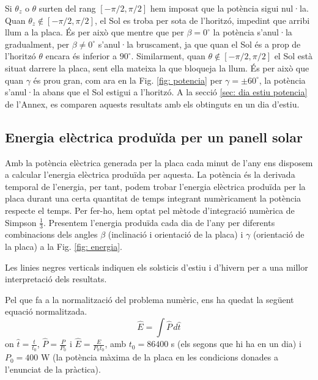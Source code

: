 \documentclass[11pt]{article}
\begin{document}
Si $\theta_z$ o $\theta$ surten del rang $[-\pi/2,\pi/2]$ hem imposat que la potència sigui nul·la. Quan $\theta_z \notin [-\pi/2,\pi/2]$, el Sol es troba per sota de l'horitzó, impedint que arribi llum a la placa. És per això que mentre que per $\beta = 0^{\circ}$ la potència s'anul·la gradualment, per $\beta \neq 0^{\circ}$ s'anul·la bruscament, ja que quan el Sol és a prop de l’horitzó $\theta$ encara és inferior a $90^{\circ}$. Similarment, quan $\theta \notin [-\pi/2,\pi/2]$ el Sol està situat darrere la placa, sent ella mateixa la que bloqueja la llum. És per això que quan $\gamma$ és prou gran, com ara en la Fig. \ref{fig: potencia} per $\gamma=\pm60^{\circ}$, la potència s'anul·la abans que el Sol estigui a l'horitzó. A la secció \ref{sec: dia estiu potencia} de l'Annex, es comparen aquests resultats amb els obtinguts en un dia d'estiu.

\subsection{Energia elèctrica produïda per un panell solar}
Amb la potència elèctrica generada per la placa cada minut de l'any ens disposem a calcular l'energia elèctrica produïda per aquesta. La potència és la derivada temporal de l'energia, per tant, podem trobar l'energia elèctrica produïda per la placa durant una certa quantitat de temps integrant numèricament la potència respecte el temps. Per fer-ho, hem optat pel mètode d'integració numèrica de Simpson $\frac{1}{3}$. Presentem l'energia produïda cada dia de l'any per diferents combinacions dels angles $\beta$ (inclinació i orientació de la placa) i $\gamma$ (orientació de la placa) a la Fig. \ref{fig: energia}.



Les linies negres verticals indiquen els solsticis d'estiu i d'hivern per a una millor interpretació dels resultats.

Pel que fa a la normalització del problema numèric, ens ha quedat la següent equació normalitzada.
\begin{equation}
    \hat{E} = \int \hat{P} \, d\hat{t}
    \label{energia}
\end{equation}
on $\hat{t}=\frac{t}{t_0}$, $\hat{P}=\frac{P}{P_0}$ i $\hat{E}=\frac{E}{P_0 t_0}$, amb $t_0=86400$ s (els segons que hi ha en un dia) i $P_0=400$ W (la potència màxima de la placa en les condicions donades a l'enunciat de la pràctica). 
\end{document}
